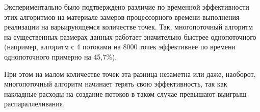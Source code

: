 \documentclass[12pt]{report}
\begin{document}
	Экспериментально было подтверждено различие по временной эффективности этих алгоритмов на материале замеров процессорного времени выполнения реализации на варьирующемся количестве точек. Так, многопоточный алгоритм на существенных размерах данных работает значительно быстрее однопоточного (например, алгоритм с 4 потоками на 8000 точек эффективнее по времени однопоточного примерно на 45,7\%).
	
	При этом на малом количестве точек эта разница незаметна или даже, наоборот, многопоточный алгоритм начинает терять свою эффективность, так как накладные расходы на создание потоков в таком случае превышают выигрыш распараллеливания.
	
	
	
	
\end{document}
